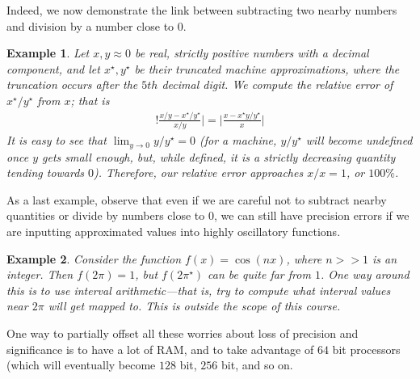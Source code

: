 \documentclass[12pt,reqno]{amsart}
\numberwithin{equation}{section}  %
\newtheorem{example}{Example}[section]
\begin{document}
Indeed, we now demonstrate the link between subtracting two nearby numbers
and division by a number close to $0$.
\begin{example}
 Let $x, y \approx 0$ be real, strictly positive
numbers with a decimal component, and let $x^\star, y^\star$ be their truncated
machine approximations, where the truncation occurs after the $5th$ decimal digit.
We compute the relative error of $x^\star/y^\star$ from $x$; that is
\begin{align*}
!\frac{x/y - x^\star/y^\star}{x/y} |  = | \frac{x - x^\star y/y^\star}{x} |
\end{align*}
It is easy to see that $\lim_{y \to 0 }y/y^\star = 0$ (for a machine, $y/y^\star$
will become undefined once $y$ gets small enough, but, while defined, it is
a strictly decreasing quantity tending towards $0$). Therefore, our relative
error approaches $x/x = 1$, or $100\%$.
\end{example}
As a last example, observe that even if we are careful not to subtract nearby
quantities or divide by numbers close to $0$, we can still have precision errors
if we are inputting approximated values into highly oscillatory functions.
\begin{example}
Consider the function $f(x) = \cos(nx)$, where $n >> 1$ is an integer.
Then $f(2\pi) = 1$, but $f(2 \pi^\star)$ can be quite far from $1$.
One way around this is to use interval arithmetic---that is, try to
compute what interval values near $2 \pi$ will get mapped to. This is
outside the scope of this course.
\end{example}
One way to partially offset all these worries about loss of precision
and significance is to have a lot of RAM, and to take advantage
of $64$ bit processors (which will eventually become $128$ bit, $256$ bit,
and so on.
\end{document}
